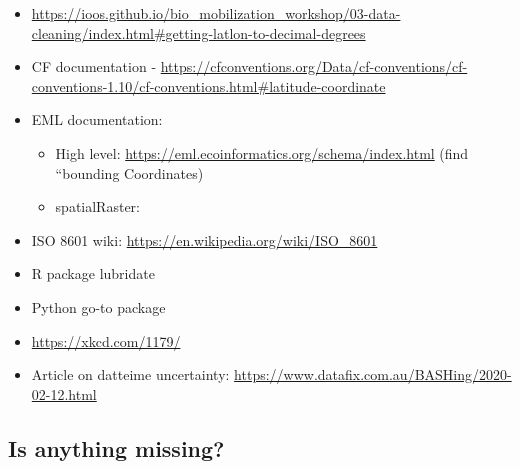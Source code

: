 \documentclass[
  oneside]{book}
\providecommand{\tightlist}{%
  \setlength{\itemsep}{0pt}\setlength{\parskip}{0pt}}
\begin{document}
\begin{itemize}
\tightlist
\item
  \url{https://ioos.github.io/bio_mobilization_workshop/03-data-cleaning/index.html\#getting-latlon-to-decimal-degrees}
\item
  CF documentation - \url{https://cfconventions.org/Data/cf-conventions/cf-conventions-1.10/cf-conventions.html\#latitude-coordinate}
\item
  EML documentation:

  \begin{itemize}
  \tightlist
  \item
    High level: \url{https://eml.ecoinformatics.org/schema/index.html} (find ``bounding Coordinates)
  \item
    spatialRaster:
  \end{itemize}
\item
  ISO 8601 wiki: \url{https://en.wikipedia.org/wiki/ISO_8601}
\item
  R package lubridate
\item
  Python go-to package
\item
  \url{https://xkcd.com/1179/}
\item
  Article on datteime uncertainty: \url{https://www.datafix.com.au/BASHing/2020-02-12.html}
\end{itemize}

\hypertarget{is-anything-missing-2}{%
\subsection{Is anything missing?}\label{is-anything-missing-2}}
\end{document}
